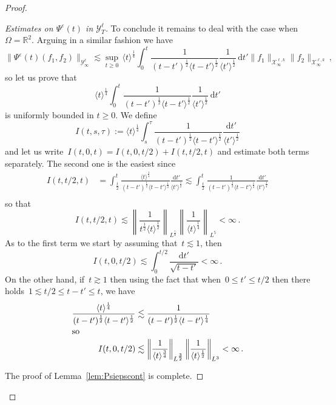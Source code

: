 \documentclass[11pt]{article}
\theoremstyle{definition}
\numberwithin{equation}{section}
\numberwithin{figure}{section}
\numberwithin{table}{section}
\newcommand*{\dd}{\mathrm{d}}
\newcommand*{\dt}{\dd t}
\newenvironment{laststep}[1]{\begin{proof}[#1]}{\end{proof}}
\newcommand*\R {\mathbb{R}}
\newcommand*\eps{{\varepsilon}}
\newcommand*\e{{\varepsilon}}
\begin{document}
\begin{proof}
\begin{laststep}{Estimates on $\Psi^\e(t)$ in $\mathcal{Y}^\ell_T$}
To conclude it remains to deal with the case when~$\Omega=\R^2$. Arguing in a similar fashion we have
\[
\|\Psi^\eps(t) (f_1,f_2) \|_{\mathcal{Y}^{\ell}_\infty} \lesssim \sup_{t \ge 0} \, \langle t \rangle^{\frac14} \int_0^t \frac{1}{(t-t')^\frac12 \langle t-t' \rangle^\frac12} \frac{1}{\langle t' \rangle^\frac12} \, \dt' \|f_1\|_{\mathcal{X}^{\ell,k}_\infty} \|f_2\|_{\mathcal{X}^{\ell,k}_\infty} \,,
\]
so let us prove that
\[
\langle t \rangle^{\frac14} \int_0^t \frac{1}{(t-t')^\frac12\langle t-t' \rangle^\frac12} \frac{1}{\langle t' \rangle^\frac12} \, \dt'
\]
is uniformly bounded in $t \ge 0$. We define
\[
I(t,s,\tau):= \langle t \rangle^{\frac14} \int_s^\tau \frac{1}{(t-t')^{\frac12}\langle t-t' \rangle^{\frac12}}\frac{\dt'}{\langle t' \rangle^{\frac12}}
\]
and let us write~$ I(t,0,t)= I(t,0,t/2)+ I(t,t/2,t)$ and estimate both terms separately. The second one is the easiest since
\begin{align*}
I(t,t/2,t) &= \int_{\frac t2}^t \frac{\langle t \rangle^{\frac14} }{(t-t')^{\frac12}\langle t-t' \rangle^{\frac12}}\frac{\dt'}{\langle t' \rangle^{\frac12}} \lesssim \int_{\frac t2}^t \frac{1}{(t-t')^{\frac12}\langle t-t' \rangle^{\frac12}}\frac{\dt'}{\langle t' \rangle^{\frac14}} \\
\end{align*}
so that
\[
I(t,t/2,t) \lesssim \left\| \frac{1}{{t^{\frac12}\langle t \rangle^{\frac12}}} \right\|_{L^{\frac54} } \left\| \frac{1}{{\langle t \rangle^\frac14}} \right\|_{L^5 } < \infty\,.
\]
As to the first term we start by assuming that~$t\lesssim 1$, then
\[
I(t,0,t/2) \lesssim \int_0^{t/2} \frac{\dt'}{\sqrt{t-t'}} < \infty\,.
\]
On the other hand, if~$t\gtrsim 1$ then using the fact that when~$0\leq t'\leq t/2$ then there holds~$1 \lesssim t/2\leq t-t'\leq t$, we have
\begin{align*}
\frac{\langle t \rangle^{\frac14} }{(t-t')^\frac12 \langle t-t' \rangle^\frac12}&\lesssim \frac{1}{(t-t')^\frac12 \langle t-t' \rangle^\frac14}\\
\intertext{so}
I(t,0,t/2) &\lesssim \left\| \frac{1}{{\langle t \rangle^{\frac34}}} \right\|_{L^{\frac32} } \left\| \frac{1}{{\langle t \rangle^{\frac12}} }\right\|_{L^3 } < \infty\,.
\end{align*}

The proof of Lemma~\ref{lem:Psiepscont} is complete.
\end{laststep}
\let\qed\relax
\end{proof}
\end{document}
